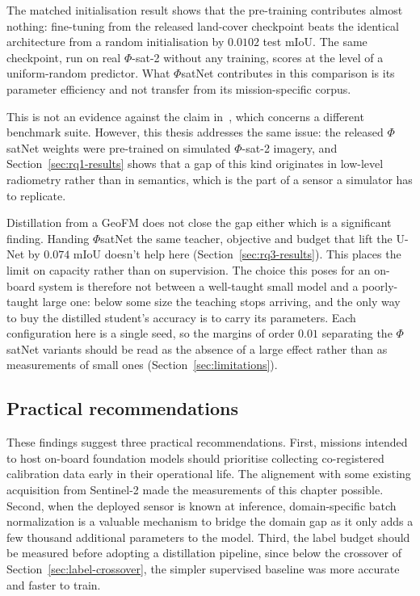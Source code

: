 The matched initialisation result shows that the pre-training contributes almost nothing: fine-tuning from the released land-cover checkpoint beats the identical architecture from a random initialisation by $0.0102$ test mIoU.
The same checkpoint, run on real $\Phi$-sat-2 without any training, scores at the level of a uniform-random predictor.
What $\Phi$satNet contributes in this comparison is its parameter efficiency and not transfer from its mission-specific corpus.

This is not an evidence against the claim in~\cite{phisatnet}, which concerns a different benchmark suite.
However, this thesis addresses the same issue: the released $\Phi$satNet weights were pre-trained on simulated $\Phi$-sat-2 imagery, and Section~\ref{sec:rq1-results} shows that a gap of this kind originates in low-level radiometry rather than in semantics, which is the part of a sensor a simulator has to replicate.

Distillation from a GeoFM does not close the gap either which is a significant finding.
Handing $\Phi$satNet the same teacher, objective and budget that lift the U-Net by $0.074$ mIoU doesn't help here (Section~\ref{sec:rq3-results}). This places the limit on capacity rather than on supervision.
The choice this poses for an on-board system is therefore not between a well-taught small model and a poorly-taught large one: below some size the teaching stops arriving, and the only way to buy the distilled student's accuracy is to carry its parameters.
Each configuration here is a single seed, so the margins of order $0.01$ separating the $\Phi$satNet variants should be read as the absence of a large effect rather than as measurements of small ones (Section~\ref{sec:limitations}).

\subsection{Practical recommendations}

These findings suggest three practical recommendations.
First, missions intended to host on-board foundation models should prioritise collecting co-registered calibration data early in their operational life.
The alignement with some existing acquisition from Sentinel-2 made the measurements of this chapter possible.
Second, when the deployed sensor is known at inference, domain-specific batch normalization is a valuable mechanism to bridge the domain gap as it only adds a few thousand additional parameters to the model.
Third, the label budget should be measured before adopting a distillation pipeline, since below the crossover of Section~\ref{sec:label-crossover}, the simpler supervised baseline was more accurate and faster to train.
